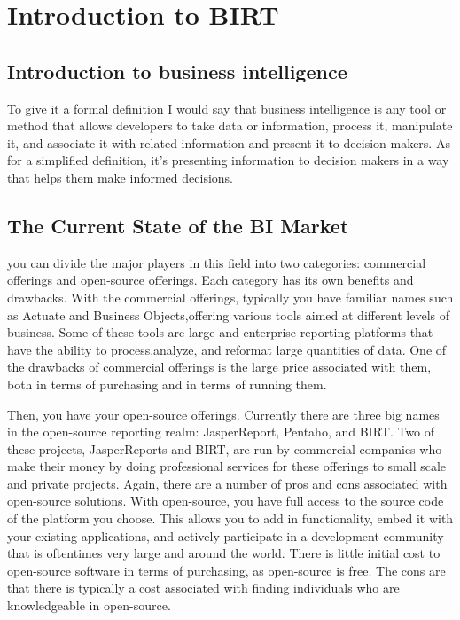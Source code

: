 
\section{Introduction to BIRT}
\label{sec:BIRT_intro}
\subsection{Introduction to business intelligence}

To give it a formal definition I would say that business intelligence is any tool
or method that allows developers to take data or information, process it,
manipulate it, and associate it with related information and present it to
decision makers. As for a simplified definition, it's presenting information to
decision makers in a way that helps them make informed decisions.

\subsection{The Current State of the BI Market}
you can divide the major players in this field into two categories: commercial
offerings and open-source offerings. Each category has its own benefits and
drawbacks. With the commercial offerings, typically you have familiar names such
as Actuate and Business Objects,offering various tools aimed at different levels
of business. Some of these tools are large and enterprise reporting platforms
that have the ability to process,analyze, and reformat large quantities of data.
One of the drawbacks of commercial offerings is the large price associated with
them, both in terms of purchasing and in terms of running them.

Then, you have your open-source offerings. Currently there are three big names in
the open-source reporting realm: JasperReport, Pentaho, and BIRT. Two of these
projects, JasperReports and BIRT, are run by commercial companies who make their
money by doing professional services for these offerings to small scale and
private projects. Again, there are a number of pros and cons associated with
open-source solutions. With open-source, you have full access to the source code
of the platform you choose. This allows you to add in functionality, embed it
with your existing applications, and actively participate in a development
community that is oftentimes very large and around the world. There is little
initial cost to open-source software in terms of purchasing, as open-source is
free. The cons are that there is typically a cost associated with finding
individuals who are knowledgeable in open-source.

